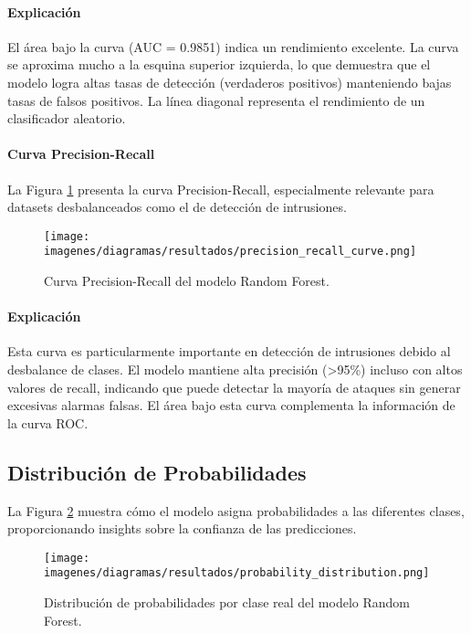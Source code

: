 \paragraph{Explicación}
El área bajo la curva (AUC = 0.9851) indica un rendimiento excelente. La curva se aproxima mucho a la esquina superior izquierda, lo que demuestra que el modelo logra altas tasas de detección (verdaderos positivos) manteniendo bajas tasas de falsos positivos. La línea diagonal representa el rendimiento de un clasificador aleatorio.

\paragraph{Curva Precision-Recall}

La Figura \ref{fig:precision_recall} presenta la curva Precision-Recall, especialmente relevante para datasets desbalanceados como el de detección de intrusiones.

\begin{figure}[H]
\centering
\texttt{[image: imagenes/diagramas/resultados/precision\_recall\_curve.png]}
\caption{Curva Precision-Recall del modelo Random Forest.}
\label{fig:precision_recall}
\end{figure}

\paragraph{Explicación}
Esta curva es particularmente importante en detección de intrusiones debido al desbalance de clases. El modelo mantiene alta precisión (>95\%) incluso con altos valores de recall, indicando que puede detectar la mayoría de ataques sin generar excesivas alarmas falsas. El área bajo esta curva complementa la información de la curva ROC.

\subsection{Distribución de Probabilidades}

La Figura \ref{fig:probability_distribution} muestra cómo el modelo asigna probabilidades a las diferentes clases, proporcionando insights sobre la confianza de las predicciones.

\begin{figure}[H]
\centering
\texttt{[image: imagenes/diagramas/resultados/probability\_distribution.png]}
\caption{Distribución de probabilidades por clase real del modelo Random Forest.}
\label{fig:probability_distribution}
\end{figure}

